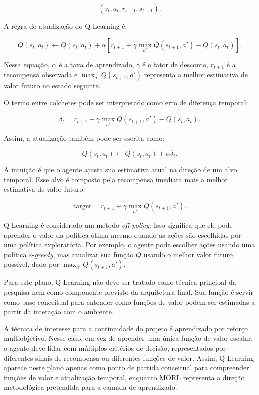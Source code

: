 \begin{equation}
(s_t, a_t, r_{t+1}, s_{t+1}).
\end{equation}

A regra de atualização do Q-Learning é:

\begin{equation}
Q(s_t,a_t)
\leftarrow
Q(s_t,a_t)
+
\alpha
\left[
r_{t+1}
+
\gamma \max_{a'} Q(s_{t+1},a')
-
Q(s_t,a_t)
\right].
\end{equation}

Nessa equação, $\alpha$ é a taxa de aprendizado, $\gamma$ é o fator de
desconto, $r_{t+1}$ é a recompensa observada e
$\max_{a'} Q(s_{t+1},a')$ representa a melhor estimativa de valor futuro no
estado seguinte.

O termo entre colchetes pode ser interpretado como erro de diferença temporal:

\begin{equation}
\delta_t =
r_{t+1}
+
\gamma \max_{a'} Q(s_{t+1},a')
-
Q(s_t,a_t).
\end{equation}

Assim, a atualização também pode ser escrita como:

\begin{equation}
Q(s_t,a_t)
\leftarrow
Q(s_t,a_t)
+
\alpha \delta_t.
\end{equation}

A intuição é que o agente ajusta sua estimativa atual na direção de um alvo
temporal.
Esse alvo é composto pela recompensa imediata mais a melhor estimativa de
valor futuro:

\begin{equation}
\text{target} =
r_{t+1}
+
\gamma \max_{a'} Q(s_{t+1},a').
\end{equation}

Q-Learning é considerado um método \textit{off-policy}.
Isso significa que ele pode aprender o valor da política ótima mesmo
quando as ações são escolhidas por uma política exploratória.
Por exemplo, o agente pode escolher ações usando uma política
$\varepsilon$-\textit{greedy}, mas atualizar sua função $Q$ usando o melhor
valor futuro possível, dado por $\max_{a'} Q(s_{t+1},a')$.

Para este plano, Q-Learning não deve ser tratado como técnica
principal da pesquisa nem como componente previsto da arquitetura
final.
Sua função é servir como base conceitual para entender como
funções de valor podem ser estimadas a partir da interação
com o ambiente.

A técnica de interesse para a continuidade do projeto é aprendizado por
reforço multiobjetivo.
Nesse caso, em vez de aprender uma única função de valor escalar, o
agente deve lidar com múltiplos critérios de decisão, representados por
diferentes sinais de recompensa ou diferentes funções de valor.
Assim, Q-Learning aparece neste plano apenas como ponto de partida
conceitual para compreender funções de valor e atualização temporal,
enquanto MORL representa a direção metodológica pretendida para a camada
de aprendizado.

